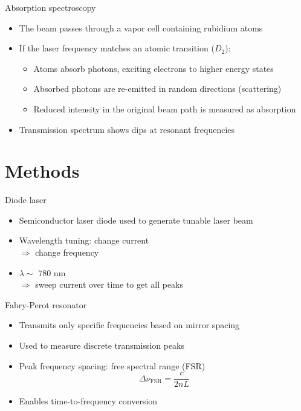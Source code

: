 \documentclass{../talk}
\begin{document}
\begin{frame}{Absorption spectroscopy}
  \begin{itemize}
    \item The beam passes through a vapor cell containing rubidium atoms
    \item<2-> If the laser frequency matches an atomic transition ($D_2$):
      \begin{itemize}
        \item Atoms absorb photons, exciting electrons to higher energy states
        \item Absorbed photons are re-emitted in random directions (scattering)
        \item Reduced intensity in the original beam path is measured as absorption
      \end{itemize}
    \item<3-> Transmission spectrum shows dips at resonant frequencies
\end{itemize}

\end{frame}

\section{Methods}

\begin{frame}{Diode laser}
  \begin{itemize}
    \item Semiconductor laser diode used to generate tunable laser beam
    \item<2-> Wavelength tuning: change current \\
      $\Rightarrow$ change frequency
    \item<3-> $\lambda \sim$ 780 nm \\
      $\Rightarrow$ sweep current over time to get all peaks
\end{itemize}

\end{frame}

\begin{frame}{Fabry-Perot resonator}
  \begin{itemize}
    \item Transmits only specific frequencies based on mirror spacing
    \item<2-> Used to measure discrete transmission peaks
    \item<3-> Peak frequency spacing: free spectral range (FSR)
      \begin{equation}
        \Delta \nu_\text{FSR} = \frac{c}{2 n L}
      \end{equation}
    \item<4-> Enables time-to-frequency conversion
  \end{itemize}
\end{frame}
\end{document}
